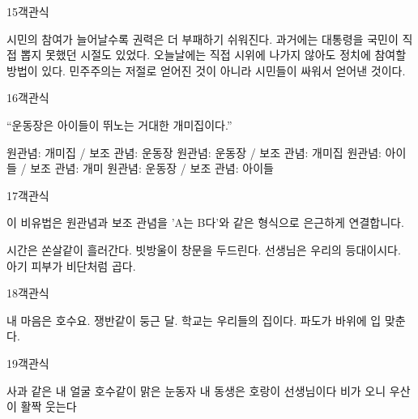 \documentclass[fs95,seriesFre]{korfarm-base}
\begin{document}
\begin{kfQBlock}{15}{객관식}
\begin{kfChoices}
\kfChoice 시민의 참여가 늘어날수록 권력은 더 부패하기 쉬워진다.
\kfChoice 과거에는 대통령을 국민이 직접 뽑지 못했던 시절도 있었다.
\kfChoice 오늘날에는 직접 시위에 나가지 않아도 정치에 참여할 방법이 있다.
\kfChoice 민주주의는 저절로 얻어진 것이 아니라 시민들이 싸워서 얻어낸 것이다.
\end{kfChoices}
\end{kfQBlock}

\begin{kfQBlock}{16}{객관식}
\begin{kfEvidence}“운동장은 아이들이 뛰노는 거대한 개미집이다.”\end{kfEvidence}
\begin{kfChoices}
\kfChoice 원관념: 개미집 / 보조 관념: 운동장
\kfChoice 원관념: 운동장 / 보조 관념: 개미집
\kfChoice 원관념: 아이들 / 보조 관념: 개미
\kfChoice 원관념: 운동장 / 보조 관념: 아이들
\end{kfChoices}
\end{kfQBlock}

\begin{kfQBlock}{17}{객관식}
\begin{kfEvidence}이 비유법은 원관념과 보조 관념을 'A는 B다'와 같은 형식으로 은근하게 연결합니다.\end{kfEvidence}
\begin{kfChoices}
\kfChoice 시간은 쏜살같이 흘러간다.
\kfChoice 빗방울이 창문을 두드린다.
\kfChoice 선생님은 우리의 등대이시다.
\kfChoice 아기 피부가 비단처럼 곱다.
\end{kfChoices}
\end{kfQBlock}

\begin{kfQBlock}{18}{객관식}
\begin{kfChoices}
\kfChoice 내 마음은 호수요.
\kfChoice 쟁반같이 둥근 달.
\kfChoice 학교는 우리들의 집이다.
\kfChoice 파도가 바위에 입 맞춘다.
\end{kfChoices}
\end{kfQBlock}

\begin{kfQBlock}{19}{객관식}
\begin{kfChoices}
\kfChoice 사과 같은 내 얼굴
\kfChoice 호수같이 맑은 눈동자
\kfChoice 내 동생은 호랑이 선생님이다
\kfChoice 비가 오니 우산이 활짝 웃는다
\end{kfChoices}
\end{kfQBlock}
\end{document}
